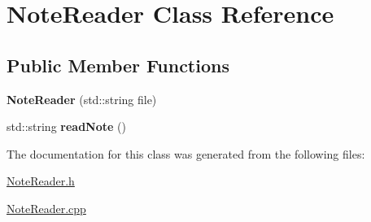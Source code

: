\hypertarget{classNoteReader}{\section{Note\-Reader Class Reference}
\label{classNoteReader}
}
\subsection*{Public Member Functions}
\begin{DoxyCompactItemize}
\item 
\hypertarget{classNoteReader_a56b11b806ae975d57c5603f25b21392c}{{\bfseries Note\-Reader} (std\-::string file)}\label{classNoteReader_a56b11b806ae975d57c5603f25b21392c}

\item 
\hypertarget{classNoteReader_a6ea3f113c16366407736a3534bd709ac}{std\-::string {\bfseries read\-Note} ()}\label{classNoteReader_a6ea3f113c16366407736a3534bd709ac}

\end{DoxyCompactItemize}


The documentation for this class was generated from the following files\-:\begin{DoxyCompactItemize}
\item 
\hyperlink{NoteReader_8h}{Note\-Reader.\-h}\item 
\hyperlink{NoteReader_8cpp}{Note\-Reader.\-cpp}\end{DoxyCompactItemize}
